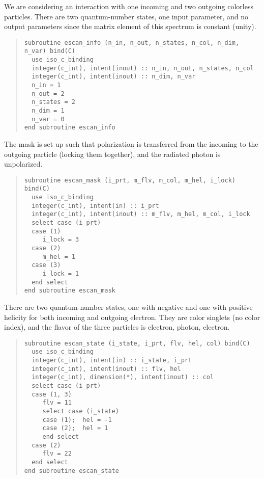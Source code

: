 \documentclass[12pt]{book}
\begin{document}
We are considering an interaction with one incoming and two outgoing
colorless particles.  There are two quantum-number states, one input
parameter, and no output parameters since the matrix element of this
spectrum is constant (unity).
\begin{quote}
  \begin{footnotesize}
\begin{verbatim}
subroutine escan_info (n_in, n_out, n_states, n_col, n_dim, n_var) bind(C)
  use iso_c_binding
  integer(c_int), intent(inout) :: n_in, n_out, n_states, n_col
  integer(c_int), intent(inout) :: n_dim, n_var
  n_in = 1
  n_out = 2
  n_states = 2
  n_dim = 1
  n_var = 0
end subroutine escan_info
\end{verbatim}
  \end{footnotesize}
\end{quote}
The mask is set up such that polarization is transferred from the
incoming to the outgoing particle (locking them together), and the
radiated photon is unpolarized.
\begin{quote}
  \begin{footnotesize}
\begin{verbatim}
subroutine escan_mask (i_prt, m_flv, m_col, m_hel, i_lock) bind(C)
  use iso_c_binding
  integer(c_int), intent(in) :: i_prt
  integer(c_int), intent(inout) :: m_flv, m_hel, m_col, i_lock
  select case (i_prt)
  case (1)
     i_lock = 3
  case (2)
     m_hel = 1
  case (3)
     i_lock = 1
  end select
end subroutine escan_mask
\end{verbatim}
  \end{footnotesize}
\end{quote}
There are two quantum-number states, one with negative and one with
positive helicity for both incoming and outgoing electron.  They are
color singlets (no color index), and the flavor of the three particles
is electron, photon, electron.
\begin{quote}
  \begin{footnotesize}
\begin{verbatim}
subroutine escan_state (i_state, i_prt, flv, hel, col) bind(C)
  use iso_c_binding
  integer(c_int), intent(in) :: i_state, i_prt
  integer(c_int), intent(inout) :: flv, hel
  integer(c_int), dimension(*), intent(inout) :: col
  select case (i_prt)
  case (1, 3)
     flv = 11
     select case (i_state)
     case (1);  hel = -1
     case (2);  hel = 1
     end select
  case (2)
     flv = 22
  end select
end subroutine escan_state
\end{verbatim}
  \end{footnotesize}
\end{quote}
\end{document}
